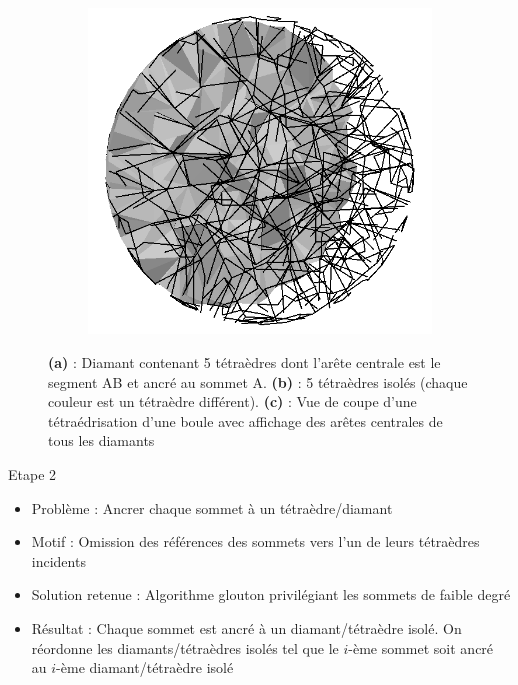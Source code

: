 \documentclass[9pt]{beamer}
\begin{document}
\begin{frame}
\begin{figure}[H]
\begin{subfigure}{.32\textwidth}
  \caption{}
  \label{fig:explosion_diamond}
\end{subfigure}
\begin{subfigure}{.32\textwidth}
  \centering
  \includegraphics[scale=0.12]{Images/central_edges}
  \caption{}
\end{subfigure}
\caption{\textbf{(a)} : Diamant contenant 5 tétraèdres dont l'arête centrale est le segment AB et ancré au sommet A. \textbf{(b)} : 5 tétraèdres isolés (chaque couleur est un tétraèdre différent). \textbf{(c)} : Vue de coupe d'une tétraédrisation d'une boule avec affichage des arêtes centrales de tous les diamants}
\end{figure}

\begin{block}{Etape 2}
\begin{itemize}
\item Problème : Ancrer chaque sommet à un tétraèdre/diamant
\item Motif : Omission des références des sommets vers l'un de leurs tétraèdres incidents
\item Solution retenue : Algorithme glouton privilégiant les sommets de faible degré
\item Résultat : Chaque sommet est ancré à un diamant/tétraèdre isolé. On réordonne les diamants/tétraèdres isolés tel que le $i$-ème sommet soit ancré au $i$-ème diamant/tétraèdre isolé
\end{itemize}
\end{block}
\end{frame}
\end{document}
